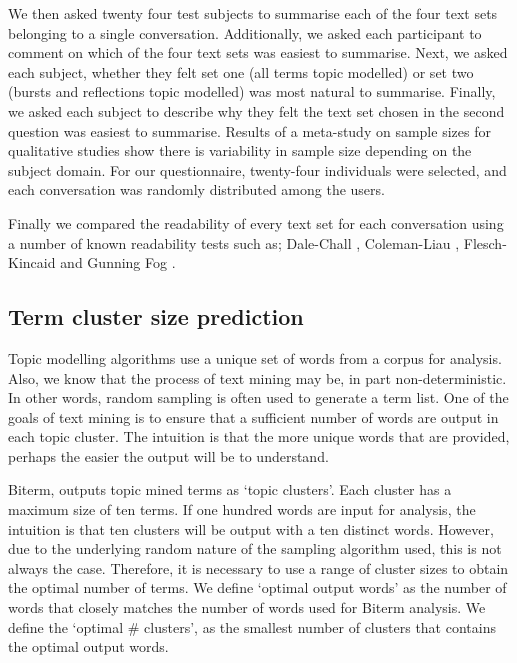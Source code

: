 We then asked twenty four test subjects to summarise each of the four text sets belonging to a single conversation. Additionally, we asked each participant to comment on which of the four text sets was easiest to summarise. Next, we asked each subject, whether they felt set one (all terms topic modelled) or set two (bursts and reflections topic modelled) was most natural to summarise. Finally, we asked each subject to describe why they felt the text set chosen in the second question was easiest to summarise. Results of a meta-study on sample sizes for qualitative studies \cite{qualsample} show there is variability in sample size depending on the subject domain. For our questionnaire, twenty-four individuals were selected, and each conversation was randomly distributed among the users.

Finally we compared the readability of every text set for each conversation using a number of known readability tests such as; Dale-Chall \cite{dale1948formula}, Coleman-Liau \cite{coleman1975computer}, Flesch-Kincaid \cite{kincaid1975derivation} and Gunning Fog \cite{gunning1952technique}. 

\subsection{Term cluster size prediction}

Topic modelling algorithms use a unique set of words from a corpus for analysis. Also, we know that the process of text mining may be, in part non-deterministic. In other words, random sampling is often used to generate a term list. One of the goals of text mining is to ensure that a sufficient number of words are output in each topic cluster. The intuition is that the more unique words that are provided, perhaps the easier the output will be to understand.

Biterm, outputs topic mined terms as `topic clusters'. Each cluster has a maximum size of ten terms. If one hundred words are input for analysis, the intuition is that ten clusters will be output with a ten distinct words. However, due to the underlying random nature of the sampling algorithm used, this is not always the case. Therefore, it is necessary to use a range of cluster sizes to obtain the optimal number of terms. We define `optimal output words' as the number of words that closely matches the number of words used for Biterm analysis. We define the `optimal \# clusters', as the smallest number of clusters that contains the optimal output words.


